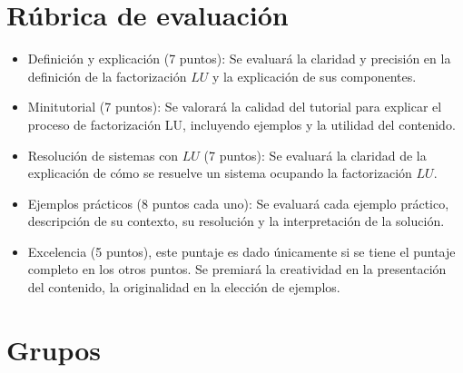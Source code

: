 \documentclass[a4,11pt]{aleph-notas}
\begin{document}
\section{Rúbrica de evaluación}

\begin{itemize}
\item
    Definición y explicación (7 puntos): Se evaluará la claridad y precisión en la definición de la factorización $LU$ y la explicación de sus componentes.
\item 
    Minitutorial (7 puntos): Se valorará la calidad del tutorial para explicar el proceso de factorización LU, incluyendo ejemplos y la utilidad del contenido.
\item 
    Resolución de sistemas con $LU$ (7 puntos): Se evaluará la claridad de la explicación de cómo se resuelve un sistema ocupando la factorización $LU$.
\item 
    Ejemplos prácticos (8 puntos cada uno): Se evaluará cada ejemplo práctico, descripción de su contexto, su resolución y la interpretación de la solución.
\item
    Excelencia (5 puntos), este puntaje es dado únicamente si se tiene el puntaje completo en los otros puntos. Se premiará la creatividad en la presentación del contenido, la originalidad en la elección de ejemplos.    
\end{itemize}

\section{Grupos}
\end{document}
